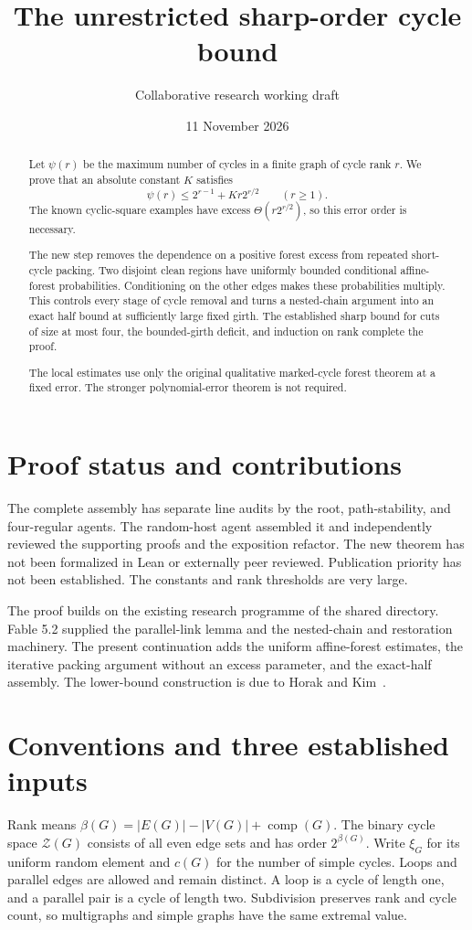 \documentclass[11pt]{article}
\title{The unrestricted sharp-order cycle bound}
\author{Collaborative research working draft}
\date{11 November 2026}
\newcommand{\comp}{\operatorname{comp}}
\begin{document}
\maketitle
\begin{abstract}
Let $\psi(r)$ be the maximum number of cycles in a finite graph of cycle rank $r$.
We prove that an absolute constant $K$ satisfies
\[
 \psi(r)\le 2^{r-1}+Kr2^{r/2}\qquad(r\ge1).
\]
The known cyclic-square examples have excess $\Theta(r2^{r/2})$, so this error order is necessary.

The new step removes the dependence on a positive forest excess from repeated short-cycle packing.
Two disjoint clean regions have uniformly bounded conditional affine-forest probabilities.
Conditioning on the other edges makes these probabilities multiply.
This controls every stage of cycle removal and turns a nested-chain argument into an exact half bound at sufficiently large fixed girth.
The established sharp bound for cuts of size at most four, the bounded-girth deficit, and induction on rank complete the proof.

The local estimates use only the original qualitative marked-cycle forest theorem at a fixed error.
The stronger polynomial-error theorem is not required.
\end{abstract}

\section*{Proof status and contributions}
The complete assembly has separate line audits by the root, path-stability, and four-regular agents.
The random-host agent assembled it and independently reviewed the supporting proofs and the exposition refactor.
The new theorem has not been formalized in Lean or externally peer reviewed.
Publication priority has not been established.
The constants and rank thresholds are very large.

The proof builds on the existing research programme of the shared directory.
Fable 5.2 supplied the parallel-link lemma and the nested-chain and restoration machinery.
The present continuation adds the uniform affine-forest estimates, the iterative packing argument without an excess parameter, and the exact-half assembly.
The lower-bound construction is due to Horak and Kim~\cite{HK}.

\clearpage
\tableofcontents

\section{Conventions and three established inputs}
Rank means $\beta(G)=|E(G)|-|V(G)|+\comp(G)$.
The binary cycle space $\mathcal Z(G)$ consists of all even edge sets and has order $2^{\beta(G)}$.
Write $\xi_G$ for its uniform random element and $c(G)$ for the number of simple cycles.
Loops and parallel edges are allowed and remain distinct.
A loop is a cycle of length one, and a parallel pair is a cycle of length two.
Subdivision preserves rank and cycle count, so multigraphs and simple graphs have the same extremal value.
\end{document}
